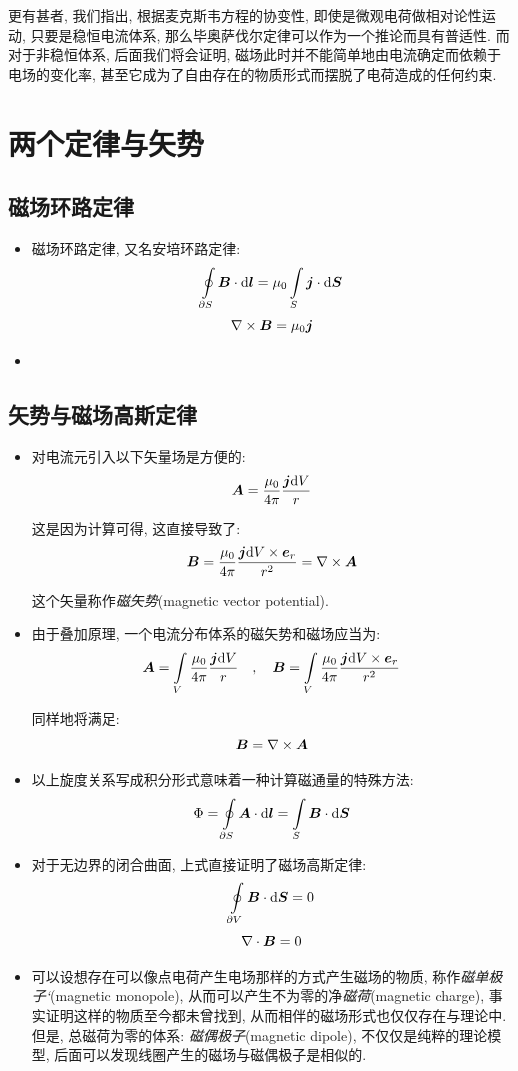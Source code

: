 更有甚者, 我们指出, 根据麦克斯韦方程的协变性, 即使是微观电荷做相对论性运动, 只要是稳恒电流体系, 那么毕奥萨伐尔定律可以作为一个推论而具有普适性. 而对于非稳恒体系, 后面我们将会证明, 磁场此时并不能简单地由电流确定而依赖于电场的变化率, 甚至它成为了自由存在的物质形式而摆脱了电荷造成的任何约束.




\section{两个定律与矢势}

\subsection{磁场环路定律}

\begin{itemize}

\item 磁场环路定律, 又名安培环路定律:
\[\oint\limits_{\partial S}\boldsymbol{B}\cdot \textrm{d} \boldsymbol{l}=\mu_0 \int\limits_S\boldsymbol{j}\cdot \textrm{d} \boldsymbol{S}\]
\[\nabla\times \boldsymbol{B}=\mu_0 \boldsymbol{j}\]

\item 
\end{itemize}

\subsection{矢势与磁场高斯定律}

\begin{itemize}

\item 对电流元引入以下矢量场是方便的:
\[\boldsymbol{A}=\frac{\mu_0}{4\pi}\frac{\boldsymbol{j}\textrm{d} V}{r}\]

这是因为计算可得, 这直接导致了:
\[\boldsymbol{B}=\frac{\mu_0}{4\pi}\frac{\boldsymbol{j}\textrm{d} V\times \boldsymbol{e}_r}{r^2}=\nabla\times \boldsymbol{A}\]

这个矢量称作\emph{磁矢势}(magnetic vector potential).

\item 由于叠加原理, 一个电流分布体系的磁矢势和磁场应当为:
\[\boldsymbol{A}=\int\limits_V \frac{\mu_0}{4\pi}\frac{\boldsymbol{j}\textrm{d} V}{r}\quad ,\quad \boldsymbol{B}=\int\limits_V \frac{\mu_0}{4\pi}\frac{\boldsymbol{j}\textrm{d} V\times \boldsymbol{e}_r}{r^2}\]

同样地将满足:
\[\boldsymbol{B}=\nabla\times \boldsymbol{A}\]

\item 以上旋度关系写成积分形式意味着一种计算磁通量的特殊方法:
\[\Phi=\oint\limits_{\partial S} \boldsymbol{A}\cdot \textrm{d} \boldsymbol{l}=\int\limits_S\boldsymbol{B}\cdot \textrm{d} \boldsymbol{S}\]


\item 对于无边界的闭合曲面, 上式直接证明了磁场高斯定律:
\[\oint\limits_{\partial V}\boldsymbol{B}\cdot \textrm{d} \boldsymbol{S}=0\]
\[\nabla\cdot \boldsymbol{B}=0\]

\item 可以设想存在可以像点电荷产生电场那样的方式产生磁场的物质, 称作\emph{磁单极子`}(magnetic monopole), 从而可以产生不为零的净\emph{磁荷}(magnetic charge), 事实证明这样的物质至今都未曾找到, 从而相伴的磁场形式也仅仅存在与理论中. 但是, 总磁荷为零的体系: \emph{磁偶极子}(magnetic dipole), 不仅仅是纯粹的理论模型, 后面可以发现线圈产生的磁场与磁偶极子是相似的.
\end{itemize}


